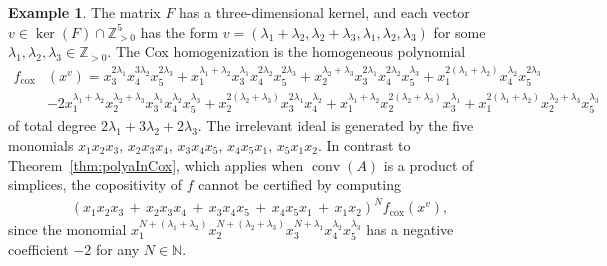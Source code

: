 \documentclass[a4paper,11pt]{amsart}
\theoremstyle{definition}
\newtheorem{example}[theorem]{Example}
\DeclareMathOperator{\conv}{conv}
\newcommand{\ZZ}{\mathbb{Z}}
\newcommand{\cox}{\mathrm{cox}}
\begin{document}
\begin{example}
    The matrix $F$ has a three-dimensional kernel,  and each vector $v \in \ker(F) \cap \ZZ^5_{>0}$ has the form $v=( \lambda_1 + \lambda_2, \lambda_2 + \lambda_3, \lambda_1,\lambda_2,\lambda_3)$ for some $\lambda_1,\lambda_2,\lambda_3 \in \ZZ_{>0}$.  
 The Cox homogenization is the homogeneous polynomial
  \begin{align*}
f_\cox&(x^v) =  x_3^{2\lambda_1}x_4^{3\lambda_2}x_5^{2\lambda_3} + x_1^{\lambda_1 + \lambda_2} x_3^{\lambda_1} x_4^{2\lambda_2} x_5^{2\lambda_3} + x_2^{\lambda_2 + \lambda_3} x_3^{2\lambda_1} x_4^{2\lambda_2}x_5^{\lambda_3} + x_1^{2(\lambda_1+\lambda_2)}x_4^{\lambda_2}x_5^{2\lambda_3} \\
&-2x_1^{\lambda_1 + \lambda_2} x_2^{\lambda_2 + \lambda_3} x_3^{\lambda_1} x_4^{\lambda_2} x_5^{\lambda_3}+x_2^{2(\lambda_2 + \lambda_3)}x_3^{2\lambda_1}x_4^{\lambda_2}+x_1^{\lambda_1+\lambda_2} x_2^{2(\lambda_2 + \lambda_3)} x_3^{\lambda_1}+x_1^{2(\lambda_1 + \lambda_2)}x_2^{\lambda_2 + \lambda_3}x_5^{\lambda_3}
    \end{align*}
    of total degree $2\lambda_1 + 3 \lambda_2 + 2 \lambda_3$.
    The irrelevant ideal is generated by the five monomials $x_1x_2x_3,\,x_2x_3x_4,\,x_3x_4x_5,\,x_4x_5x_1,\,x_5x_1x_2$.
In contrast to Theorem~\ref{thm:polyaInCox}, which applies when $\conv(A)$ is a product of simplices, the copositivity of $f$ cannot be certified by computing
  \begin{align}
  \label{eq:counterex1}
(x_1 x_2 x_3\,+\,x_2 x_3 x_4\,+\,x_3 x_4 x_5\,+\,x_4 x_5 x_1\,+\,x_1 x_2)^N f_{\cox}(x^v),
    \end{align} 
    since the monomial $x_1^{N+(\lambda_1+\lambda_2)}x_2^{N+(\lambda_2 + \lambda_3)}x_3^{N+\lambda_1}x_4^{\lambda_2}x_5^{\lambda_3}$ has a negative coefficient $-2$ for any $N \in \mathbb{N}$. 

\end{example}
\end{document}

